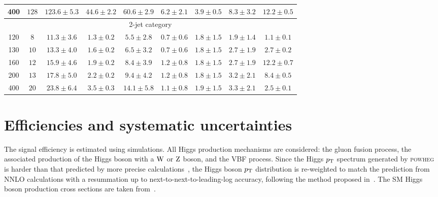 \documentclass[12pt,twoside,a4paper,cmspaper,final,collab]{cms-tdr}
\begin{document}
\begin{table}[htbp]
\begin{center}
{\begin{tabular} {|c|c|c|c|c|c|c|c|c|}
400 & $128$ & $123.6\pm5.3$  & $44.6\pm2.2$   & $60.6\pm2.9$ & $6.2\pm2.1$  & $3.9\pm0.5$ & $8.3\pm3.2$  & $12.2\pm0.5$ \\ \hline
\multicolumn{9}{|c|}{2-jet category} \\
  \hline
120 & $8$   & $11.3\pm3.6$   & $1.3\pm0.2$    & $5.5\pm2.8$  & $0.7\pm0.6$  & $1.8\pm1.5$ & $1.9\pm1.4$ & $1.1\pm0.1$  \\ \hline
130 & $10$  & $13.3\pm4.0$   & $1.6\pm0.2$    & $6.5\pm3.2$  & $0.7\pm0.6$  & $1.8\pm1.5$ & $2.7\pm1.9$ & $2.7\pm0.2$  \\ \hline
160 & $12$  & $15.9\pm4.6$   & $1.9\pm0.2$    & $8.4\pm3.9$  & $1.2\pm0.8$  & $1.8\pm1.5$ & $2.7\pm1.9$ & $12.2\pm0.7$ \\ \hline
200 & $13$  & $17.8\pm5.0$   & $2.2\pm0.2$    & $9.4\pm4.2$  & $1.2\pm0.8$  & $1.8\pm1.5$ & $3.2\pm2.1$ & $8.4\pm0.5$  \\ \hline
400 & $20$  & $23.8\pm6.4$   & $3.5\pm0.3$    & $14.1\pm5.8$ & $1.1\pm0.8$  & $1.9\pm1.5$ & $3.3\pm2.1$ & $2.5\pm0.1$  \\ \hline
  \end{tabular}
  }
  \end{center}
\end{table}

\section{Efficiencies and systematic uncertainties}
\label{sec:systematics}

The signal efficiency is estimated using simulations.
All Higgs production mechanisms are considered:
the gluon fusion process, the associated production of the Higgs boson with
a $\mathrm{W}$ or $\mathrm{Z}$ boson, and the VBF process. Since the Higgs $p_{\mathrm{T}}$ spectrum generated by
\textsc{powheg} is harder than that predicted by more
precise calculations~\cite{Bozzi:2005wk,deFlorian:2011xf}, the Higgs boson $p_{\mathrm{T}}$ distribution
is re-weighted to match the prediction from NNLO calculations with a resummation up to
next-to-next-to-leading-log accuracy, following the method proposed in~\cite{reweighting}.
The SM Higgs boson production cross sections are taken
from~\cite{LHCHiggsCrossSectionWorkingGroup:2011ti,Dawson:1990zj,Spira:1995rr,Harlander:2002wh,Anastasiou:2002yz,Tackmann:2011,Ravindran:2003um,Catani:2003zt,Actis:2008ug,Anastasiou:2008tj,deFlorian:2009hc,Ciccolini:2007jr,Ciccolini:2007ec,Arnold:2008rz,Brein:2003wg,Ciccolini:2003jy,hdecay2,Denner:2011mq,Bredenstein:2006rh,Bredenstein:2006ha}.
\end{document}
